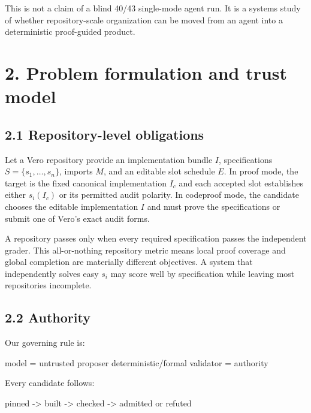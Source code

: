 \documentclass[
  10pt,
]{article}
\newenvironment{Shaded}{}{}
\newcommand{\NormalTok}[1]{#1}
\begin{document}
This is not a claim of a blind 40/43 single-mode agent run. It is a
systems study of whether repository-scale organization can be moved from
an agent into a deterministic proof-guided product.

\section{2. Problem formulation and trust
model}\label{problem-formulation-and-trust-model}

\subsection{2.1 Repository-level
obligations}\label{repository-level-obligations}

Let a Vero repository provide an implementation bundle \(I\),
specifications \(S=\{s_1,\ldots,s_n\}\), imports \(M\), and an editable
slot schedule \(E\). In proof mode, the target is the fixed canonical
implementation \(I_c\) and each accepted slot establishes either
\(s_i(I_c)\) or its permitted audit polarity. In codeproof mode, the
candidate chooses the editable implementation \(I\) and must prove the
specifications or submit one of Vero's exact audit forms.

A repository passes only when every required specification passes the
independent grader. This all-or-nothing repository metric means local
proof coverage and global completion are materially different
objectives. A system that independently solves easy \(s_i\) may score
well by specification while leaving most repositories incomplete.

\subsection{2.2 Authority}\label{authority}

Our governing rule is:

\begin{Shaded}
\begin{Highlighting}[]
\NormalTok{model = untrusted proposer}
\NormalTok{deterministic/formal validator = authority}
\end{Highlighting}
\end{Shaded}

Every candidate follows:

\begin{Shaded}
\begin{Highlighting}[]
\NormalTok{pinned {-}\textgreater{} built {-}\textgreater{} checked {-}\textgreater{} admitted or refuted}
\end{Highlighting}
\end{Shaded}
\end{document}
